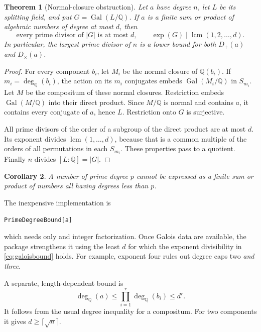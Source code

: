 \documentclass[11pt,a4paper]{article}
\newtheorem{theorem}{Theorem}[section]
\newtheorem{corollary}[theorem]{Corollary}
\theoremstyle{definition}\newtheorem{definition}[theorem]{Definition}
\theoremstyle{remark}\newtheorem{remark}[theorem]{Remark}
\newcommand{\Q}{\mathbb Q}
\newcommand{\Gal}{\operatorname{Gal}}
\newcommand{\dega}{\operatorname{deg}_{\Q}}
\newcommand{\Dplus}{D_{+}}
\newcommand{\Dtimes}{D_{\times}}
\newcommand{\code}[1]{\texttt{\detokenize{#1}}}
\begin{document}
\begin{theorem}[Normal-closure obstruction]\label{thm:bound}
Let $a$ have degree $n$, let $L$ be its splitting field, and put
$G=\Gal(L/\Q)$. If $a$ is a finite sum or product of algebraic numbers of
degree at most $d$, then
\begin{equation}
 \text{every prime divisor of }|G|\text{ is at most }d,
 \qquad
 \exp(G)\mid\operatorname{lcm}(1,2,\ldots,d).
 \label{eq:galoisbound}
\end{equation}
In particular, the largest prime divisor of $n$ is a lower bound for both
$\Dplus(a)$ and $\Dtimes(a)$.
\end{theorem}
\begin{proof}
For every component $b_i$, let $M_i$ be the normal closure of $\Q(b_i)$.
If $m_i=\dega(b_i)$, the action on its $m_i$ conjugates embeds
$\Gal(M_i/\Q)$ in $S_{m_i}$. Let $M$ be the compositum of these normal
closures. Restriction embeds $\Gal(M/\Q)$ into their direct product. Since
$M/\Q$ is normal and contains $a$, it contains every conjugate of $a$, hence
$L$. Restriction onto $G$ is surjective.

All prime divisors of the order of a subgroup of the direct product are at
most $d$. Its exponent divides $\operatorname{lcm}(1,\ldots,d)$, because
that is a common multiple of the orders of all permutations in each
$S_{m_i}$. These properties pass to a quotient. Finally $n$ divides
$[L:\Q]=|G|$.
\end{proof}

\begin{corollary}
A number of prime degree $p$ cannot be expressed as a finite sum or product
of numbers all having degrees less than $p$.
\end{corollary}

The inexpensive implementation is
\begin{lstlisting}
PrimeDegreeBound[a]
\end{lstlisting}
which needs only \code{MinimalPolynomial} and integer factorization. Once
Galois data are available, the package strengthens it using the least $d$
for which the exponent divisibility in \eqref{eq:galoisbound} holds. For
example, exponent four rules out degree caps two \emph{and three}.

A separate, length-dependent bound is
\begin{equation}
 \dega(a)\le\prod_{i=1}^{r}\dega(b_i)\le d^r.
 \label{eq:lengthbound}
\end{equation}
It follows from the usual degree inequality for a compositum. For two
components it gives $d\ge\lceil\sqrt n\rceil$.
\end{document}

